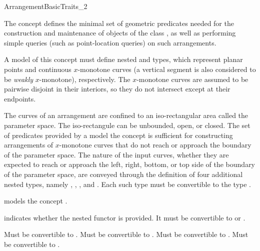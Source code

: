 
\ccRefPageBegin
\begin{ccRefConcept}{ArrangementBasicTraits_2}

\ccDefinition
The concept \ccRefName{} defines the minimal set of geometric
predicates needed for the construction and maintenance of objects of the
class , as well as performing simple queries (such as
point-location queries) on such arrangements.

A model of this concept must define nested  and
 types, which represent planar points and
continuous $x$-monotone curves (a vertical segment is also considered to be
{\sl weakly} $x$-monotone), respectively. The $x$-monotone curves are assumed
to be pairwise disjoint in their interiors, so they do not intersect
except at their endpoints.

The  curves of an arrangement are confined to an
iso-rectangular area called the parameter space. The iso-rectangule can
be unbounded, open, or closed. The set of predicates provided by a model
the concept \ccRefName{} is sufficient for constructing arrangements of
$x$-monotone curves that do not reach or approach the boundary of the
parameter space. The nature of the input curves, whether they are
expected to reach or approach the left, right, bottom, or top side of the
boundary of the parameter space, are conveyed through the definition of
four additional nested types, namely ,
, , and
. Each such type must be convertible to the type
.


\ccTypes
\ccGlue
{}
  {models the concept .}

  {indicates whether the nested functor  is
  provided. It must be convertible to  or .} 

  {Must be convertible to .}
  {Must be convertible to .}
  {Must be convertible to .}
  {Must be convertible to .}


\end{ccRefConcept}
